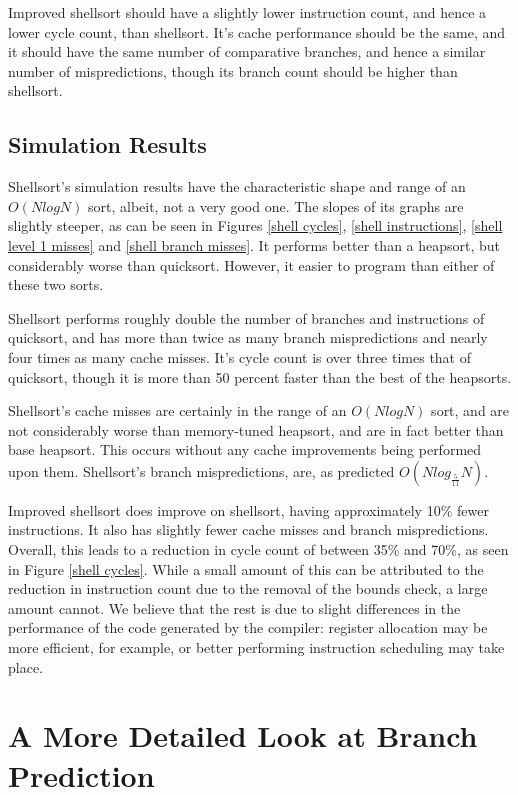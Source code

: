 Improved shellsort should have a slightly lower instruction count, and hence a
lower cycle count, than shellsort. It's cache performance should be the same,
and it should have the same number of comparative branches, and hence a similar
number of mispredictions, though its branch count should be higher than
shellsort.


\subsection{Simulation Results}

Shellsort's simulation results have the characteristic shape and range of an
$O(NlogN)$ sort, albeit, not a very good one. The slopes of its graphs are
slightly steeper, as can be seen in Figures \ref{shell cycles}, \ref{shell
instructions}, \ref{shell level 1 misses} and \ref{shell branch misses}. It
performs better than a heapsort, but considerably worse than quicksort. However,
it easier to program than either of these two sorts.

Shellsort performs roughly double the number of branches and instructions of
quicksort, and has more than twice as many branch mispredictions and nearly
four times as many cache misses. It's cycle count is over three times that of
quicksort, though it is more than 50 percent faster than the best of the
heapsorts.

Shellsort's cache misses are certainly in the range of an $O(NlogN)$ sort, and
are not considerably worse than memory-tuned heapsort, and are in fact better
than base heapsort. This occurs without any cache improvements being performed
upon them. Shellsort's branch mispredictions, are, as predicted
$O(Nlog_{\frac{5}{11}}N)$. 

Improved shellsort does improve on shellsort, having approximately 10\% fewer
instructions. It also has slightly fewer cache misses and branch mispredictions.
Overall, this leads to a reduction in cycle count of between 35\% and 70\%, as
seen in Figure \ref{shell cycles}. While a small amount of this can be
attributed to the reduction in instruction count due to the removal of the
bounds check, a large amount cannot. We believe that the rest is due to slight
differences in the performance of the code generated by the compiler: register
allocation may be more efficient, for example, or better performing instruction
scheduling may take place.

\section{A More Detailed Look at Branch Prediction}

